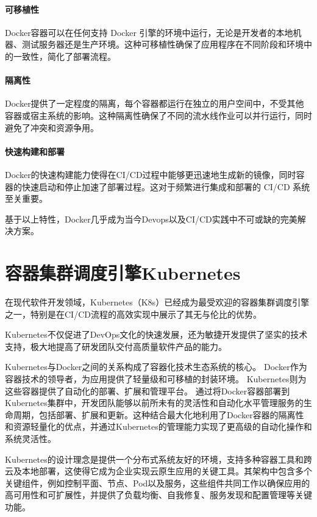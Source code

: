 \paragraph{可移植性}Docker容器可以在任何支持 Docker 引擎的环境中运行，无论是开发者的本地机器、测试服务器还是生产环境。这种可移植性确保了应用程序在不同阶段和环境中的一致性，简化了部署流程。

\paragraph{隔离性}Docker提供了一定程度的隔离，每个容器都运行在独立的用户空间中，不受其他容器或宿主系统的影响。这种隔离性确保了不同的流水线作业可以并行运行，同时避免了冲突和资源争用\cite{JSJC201708006}。

\paragraph{快速构建和部署}Docker的快速构建能力使得在CI/CD过程中能够更迅速地生成新的镜像，同时容器的快速启动和停止加速了部署过程。这对于频繁进行集成和部署的 CI/CD 系统至关重要。

基于以上特性，Docker几乎成为当今Devops以及CI/CD实践中不可或缺的完美解决方案\cite{第二章Devops}。

\section{容器集群调度引擎Kubernetes}
在现代软件开发领域，Kubernetes（K8s）已经成为最受欢迎的容器集群调度引擎之一，特别是在CI/CD流程的高效实现中展示了其无与伦比的优势\cite{XTYY202012038}\cite{mahboob2021kubernetes}。

Kubernetes不仅促进了DevOps文化的快速发展，还为敏捷开发提供了坚实的技术支持，极大地提高了研发团队交付高质量软件产品的能力\cite{carrion2022kubernetes}。

Kubernetes与Docker之间的关系构成了容器化技术生态系统的核心\cite{XDDS202202023}。
Docker作为容器技术的领导者，为应用提供了轻量级和可移植的封装环境。
Kubernetes则为这些容器提供了自动化的部署、扩展和管理平台。
通过将Docker容器部署到Kubernetes集群中，开发团队能够以前所未有的灵活性和自动化水平管理服务的生命周期，包括部署、扩展和更新。这种结合最大化地利用了Docker容器的隔离性和资源轻量化的优点，并通过Kubernetes的管理能力实现了更高级的自动化操作和系统灵活性。

Kubernetes的设计理念是提供一个分布式系统友好的环境，支持多种容器工具和跨云及本地部署，这使得它成为企业实现云原生应用的关键工具。其架构中包含多个关键组件，例如控制平面、节点、Pod以及服务，这些组件共同工作以确保应用的高可用性和可扩展性，并提供了负载均衡、自我修复、服务发现和配置管理等关键功能。

